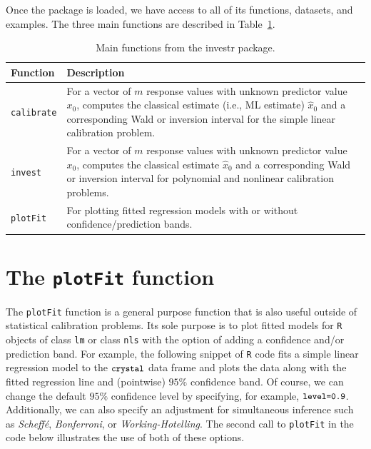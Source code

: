 \documentclass[cmfont,usenames,dvipsnames,leqno]{afit-etd}\usepackage[]{graphicx}\usepackage[]{color}
\newcommand{\code}[1]{\texttt{\small{#1}}}
\newcommand{\pkg}[1]{\textsf{\small{#1}}}
\begin{document}
\noindent Once the package is loaded, we have access to all of its functions, datasets, and examples. The three main functions are described in Table~\ref{tab:investr}.
\begin{table}[H]
\label{tab:investr}
\begin{center}
\begin{tabular}{lp{10cm}}
  \toprule
  \textbf{Function} & \textbf{Description} \\
  \midrule
  \code{calibrate} & For a vector of $m$ response values with unknown predictor value $x_0$, computes the classical estimate (i.e., ML estimate) $\widehat{x}_0$ and a corresponding Wald or inversion interval for the simple linear calibration problem. \\
  \code{invest}    & For a vector of $m$ response values with unknown predictor value $x_0$, computes the classical estimate $\widehat{x}_0$ and a corresponding Wald or inversion interval for polynomial and nonlinear calibration problems. \\
  \code{plotFit}   & For plotting fitted regression models with or without confidence/prediction bands. \\
  \bottomrule
\end{tabular}
\end{center}
\caption[Functions from the \pkg{investr} package]{Main functions from the \pkg{investr} package.}
\end{table}

\section{The \code{plotFit} function}
The \code{plotFit} function is a general purpose function that is also useful outside of statistical calibration problems. Its sole purpose is to plot fitted models for \code{R} objects of class \code{lm} or class \code{nls} with the option of adding a confidence and/or prediction band. For example, the following snippet of \code{R} code fits a simple linear regression model to the $\code{crystal}$ data frame and plots the data along with the fitted regression line and (pointwise) $95\%$ confidence band. Of course, we can change the default $95\%$ confidence level by specifying, for example, $\code{level=0.9}$. Additionally, we can also specify an adjustment for simultaneous inference such as \textit{Scheff\'{e}}, \textit{Bonferroni}, or \textit{Working-Hotelling}. The second call to \code{plotFit} in the code below illustrates the use of both of these options.
\end{document}
